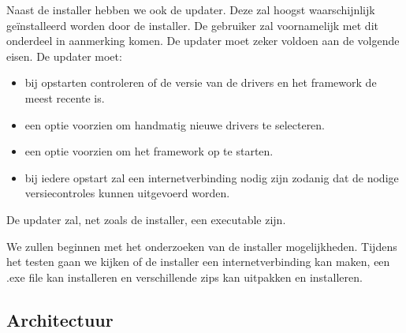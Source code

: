 \documentclass{article}
\begin{document}
Naast de installer hebben we ook de updater. Deze zal hoogst waarschijnlijk ge\"installeerd worden door de installer.
De gebruiker zal voornamelijk met dit onderdeel in aanmerking komen.
De updater moet zeker voldoen aan de volgende eisen.
De updater moet:
\begin{itemize}
\item bij opstarten controleren of de versie van de drivers en het framework de meest recente is.
\item een optie voorzien om handmatig nieuwe drivers te selecteren.
\item een optie voorzien om het framework op te starten.
\item bij iedere opstart zal een internetverbinding nodig zijn zodanig dat de nodige versiecontroles kunnen uitgevoerd worden.
\end{itemize}
De updater zal, net zoals de installer, een executable zijn.

We zullen beginnen met het onderzoeken van de installer mogelijkheden.
Tijdens het testen gaan we kijken of de installer een internetverbinding kan maken, een .exe file kan installeren en verschillende zips kan uitpakken en installeren.
\subsection{Architectuur}


%

\end{document}
